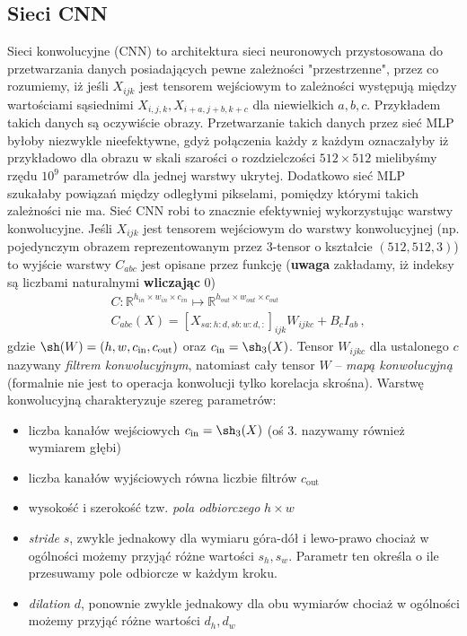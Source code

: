 \documentclass{myclass}
\begin{document}
\subsection{Sieci CNN}

Sieci konwolucyjne (CNN) to architektura sieci neuronowych przystosowana do przetwarzania danych
posiadających pewne zależności "przestrzenne", przez co rozumiemy, iż jeśli \(X_{ijk}\) jest
tensorem wejściowym to zależności występują między wartościami sąsiednimi \(X_{i,j,k},
X_{i+a,j+b,k+c}\) dla niewielkich \(a,b,c\). Przykładem takich danych są oczywiście obrazy.
Przetwarzanie takich danych przez sieć MLP byłoby niezwykle nieefektywne, gdyż połączenia każdy z
każdym oznaczałyby iż przykładowo dla obrazu w skali szarości o rozdzielczości \(512 \times 512\)
mielibyśmy rzędu \(10^9\) parametrów dla jednej warstwy ukrytej. Dodatkowo sieć MLP szukałaby
powiązań między odległymi pikselami, pomiędzy którymi takich zależności nie ma. Sieć CNN robi to
znacznie efektywniej wykorzystując warstwy konwolucyjne. Jeśli \(X_{ijk}\) jest tensorem wejściowym
do warstwy konwolucyjnej (np. pojedynczym obrazem reprezentowanym przez 3-tensor o kształcie \((512,
512, 3)\)) to wyjście warstwy \(C_{abc}\) jest opisane przez funkcję (\textbf{uwaga} zakładamy, iż
indeksy są liczbami naturalnymi \textbf{wliczając} 0)
\begin{equation*}
    \begin{split}
        &C: \mathbb{R}^{h_{in}\times w_{in}\times c_{in}} \mapsto \mathbb{R}^{h_{out}\times w_{out}\times c_{out}}\\
        &C_{abc}(X) = [X_{sa:h:d,sb:w:d,:}]_{ijk}W_{ijkc} + B_c I_{ab}\,,    
    \end{split}
\end{equation*}
gdzie \(\sh(W) = (h, w, c_\text{in}, c_\text{out})\) oraz \(c_\text{in} = \sh_3(X)\). Tensor
\(W_{ijkc}\) dla ustalonego \(c\) nazywany \textit{filtrem konwolucyjnym}, natomiast cały tensor
\(W\) -- \textit{mapą konwolucyjną} (formalnie nie jest to operacja konwolucji tylko korelacja
skrośna). Warstwę konwolucyjną charakteryzuje szereg parametrów:
\begin{itemize}
    \item liczba kanałów wejściowych \(c_\text{in} = \sh_3(X)\) (oś 3. nazywamy również wymiarem
    głębi)
    \item liczba kanałów wyjściowych równa liczbie filtrów \(c_\text{out}\)
    \item wysokość i szerokość tzw. \textit{pola odbiorczego} \(h \times w\)
    \item \textit{stride} \(s\), zwykle jednakowy dla wymiaru góra-dół i lewo-prawo chociaż w
    ogólności możemy przyjąć różne wartości \(s_h, s_w\). Parametr ten określa o ile przesuwamy pole
    odbiorcze w każdym kroku.
    \item \textit{dilation} \(d\), ponownie zwykle jednakowy dla obu wymiarów chociaż w ogólności
    możemy przyjąć różne wartości \(d_h, d_w\)
\end{itemize}
\end{document}
